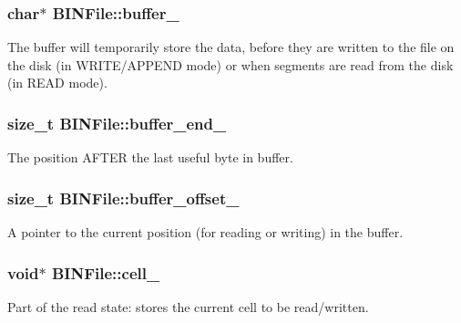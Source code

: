 \subsubsection[{buffer\+\_\+}]{\setlength{\rightskip}{0pt plus 5cm}char$\ast$ B\+I\+N\+File\+::buffer\+\_\+\hspace{0.3cm}{\ttfamily [private]}}\label{classBINFile_ac04f57a328c37aeba330851643d86455}
The buffer will temporarily store the data, before they are written to the file on the disk (in W\+R\+I\+T\+E/\+A\+P\+P\+E\+N\+D mode) or when segments are read from the disk (in R\+E\+A\+D mode). \hypertarget{classBINFile_a6638b7bd9a54172d694d9c955ad3aed7}{}
\subsubsection[{buffer\+\_\+end\+\_\+}]{\setlength{\rightskip}{0pt plus 5cm}size\+\_\+t B\+I\+N\+File\+::buffer\+\_\+end\+\_\+\hspace{0.3cm}{\ttfamily [private]}}\label{classBINFile_a6638b7bd9a54172d694d9c955ad3aed7}
The position A\+F\+T\+E\+R the last useful byte in buffer. \hypertarget{classBINFile_a93a5979fd3c9ccf0e58866e49e516890}{}
\subsubsection[{buffer\+\_\+offset\+\_\+}]{\setlength{\rightskip}{0pt plus 5cm}size\+\_\+t B\+I\+N\+File\+::buffer\+\_\+offset\+\_\+\hspace{0.3cm}{\ttfamily [private]}}\label{classBINFile_a93a5979fd3c9ccf0e58866e49e516890}
A pointer to the current position (for reading or writing) in the buffer. \hypertarget{classBINFile_a38d5e4398274c4f8493cbd74b03967d5}{}
\subsubsection[{cell\+\_\+}]{\setlength{\rightskip}{0pt plus 5cm}void$\ast$ B\+I\+N\+File\+::cell\+\_\+\hspace{0.3cm}{\ttfamily [private]}}\label{classBINFile_a38d5e4398274c4f8493cbd74b03967d5}
Part of the read state\+: stores the current cell to be read/written. \hypertarget{classBINFile_aa6035d4e2e3877f57c1b15924e22c9d0}{}
